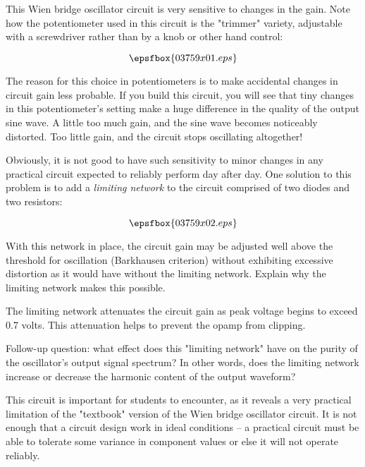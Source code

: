 

This Wien bridge oscillator circuit is very sensitive to changes in the gain.  Note how the potentiometer used in this circuit is the "trimmer" variety, adjustable with a screwdriver rather than by a knob or other hand control:

$$\epsfbox{03759x01.eps}$$

The reason for this choice in potentiometers is to make accidental changes in circuit gain less probable.  If you build this circuit, you will see that tiny changes in this potentiometer's setting make a huge difference in the quality of the output sine wave.  A little too much gain, and the sine wave becomes noticeably distorted.  Too little gain, and the circuit stops oscillating altogether!

Obviously, it is not good to have such sensitivity to minor changes in any practical circuit expected to reliably perform day after day.  One solution to this problem is to add a {\it limiting network} to the circuit comprised of two diodes and two resistors:

$$\epsfbox{03759x02.eps}$$

With this network in place, the circuit gain may be adjusted well above the threshold for oscillation (Barkhausen criterion) without exhibiting excessive distortion as it would have without the limiting network.  Explain why the limiting network makes this possible.







The limiting network attenuates the circuit gain as peak voltage begins to exceed 0.7 volts.  This attenuation helps to prevent the opamp from clipping.

\vskip 10pt

Follow-up question: what effect does this "limiting network" have on the purity of the oscillator's output signal spectrum?  In other words, does the limiting network increase or decrease the harmonic content of the output waveform?







This circuit is important for students to encounter, as it reveals a very practical limitation of the "textbook" version of the Wien bridge oscillator circuit.  It is not enough that a circuit design work in ideal conditions -- a practical circuit must be able to tolerate some variance in component values or else it will not operate reliably.




